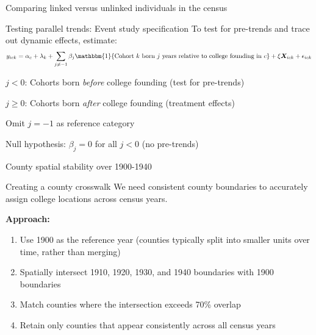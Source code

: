 \documentclass[notes,11pt, aspectratio=169]{beamer}
\newenvironment{wideitemize}{\itemize\addtolength{\itemsep}{10pt}}{\enditemize}
\begin{document}
\begin{frame}{Comparing linked versus unlinked individuals in the census}
  
\end{frame}


\begin{frame}{Testing parallel trends: Event study specification}
  To test for pre-trends and trace out dynamic effects, estimate:
  \begin{equation}
    y_{ick} = \alpha_c + \lambda_k + \sum_{j \neq -1} \beta_j \mathbbm{1}\{\text{Cohort } k \text{ born } j \text{ years relative to college founding in } c\} + \xi \bm{X}_{ick} + \epsilon_{ick}
  \end{equation}
  \begin{wideitemize}
    \item $j < 0$: Cohorts born \textit{before} college founding (test for pre-trends)
    \item $j \geq 0$: Cohorts born \textit{after} college founding (treatment effects)
    \item Omit $j = -1$ as reference category
    \item Null hypothesis: $\beta_j = 0$ for all $j < 0$ (no pre-trends)
  \end{wideitemize}
\end{frame}

\appendix
{}

\begin{frame}[label=spatialstability]{County spatial stability over 1900-1940}
    

    \vspace{1em}
    \centering
    \hyperlink{isolating}{}
\end{frame}

\begin{frame}[label=countycrosswalk]{Creating a county crosswalk}
We need consistent county boundaries to accurately assign college locations across census years.

\textbf{Approach:}
\begin{enumerate}
\item Use 1900 as the reference year (counties typically split into smaller units over time, rather than merging)
\item Spatially intersect 1910, 1920, 1930, and 1940 boundaries with 1900 boundaries
\item Match counties where the intersection exceeds 70\% overlap
\item Retain only counties that appear consistently across all census years
\end{enumerate}
\vspace{1em}
\centering
\hyperlink{isolating}{}
\end{frame}
\end{document}
